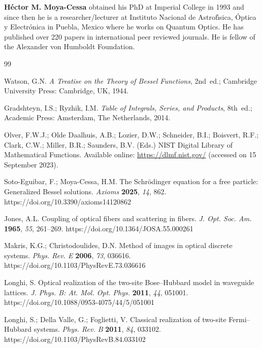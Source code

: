 \documentclass[10pt]{NSP1}
\begin{document}
\bigskip
\textbf{H\'ector M. Moya-Cessa }obtained his PhD at Imperial College in 1993
and since then he is a researcher/lecturer  at Instituto Nacional
de Astrof\'{\i}sica, \'Optica y Electr\'onica in Puebla, Mexico
where he works on Quantum Optics. He has published over 220 papers
in international peer reviewed journals. He is fellow of the
Alexander von Humboldt Foundation.
\begin{thebibliography}{99}

Watson, G.N. \textit{A Treatise on the Theory of Bessel Functions}, 2nd~ed.; 
Cambridge University Press: Cambridge, UK, 1944.

Gradshteyn, I.S.; Ryzhik, I.M. \textit{Table of Integrals, Series, and Products}, 8th~ed.; 
Academic Press: Amsterdam, The Netherlands, 2014.

Olver, F.W.J.; Olde Daalhuis, A.B.; Lozier, D.W.; Schneider, B.I.; Boisvert, R.F.; Clark, C.W.; Miller, B.R.; Saunders, B.V. (Eds.) 
NIST Digital Library of Mathematical Functions. 
Available online: \url{https://dlmf.nist.gov/} (accessed on 15 September 2023).

Soto-Eguibar, F.; Moya-Cessa, H.M. The Schr\"{o}dinger equation for a free particle: Generalized Bessel solutions. 
\textit{Axioms} \textbf{2025}, \textit{14}, 862.
https://doi.org/10.3390/axioms14120862

Jones, A.L. Coupling of optical fibers and scattering in fibers. 
\textit{J. Opt. Soc. Am.} \textbf{1965}, \textit{55}, 261--269.
https://doi.org/10.1364/JOSA.55.000261

Makris, K.G.; Christodoulides, D.N. Method of images in optical discrete systems. 
\textit{Phys. Rev. E} \textbf{2006}, \textit{73}, 036616.
https://doi.org/10.1103/PhysRevE.73.036616


Longhi, S. Optical realization of the two-site Bose--Hubbard model in waveguide lattices. 
\textit{J. Phys. B: At. Mol. Opt. Phys.} \textbf{2011}, \textit{44}, 051001.
https://doi.org/10.1088/0953-4075/44/5/051001

Longhi, S.; Della Valle, G.; Foglietti, V. Classical realization of two-site Fermi--Hubbard systems. 
\textit{Phys. Rev. B} \textbf{2011}, \textit{84}, 033102.
https://doi.org/10.1103/PhysRevB.84.033102


\end{thebibliography}
\end{document}
